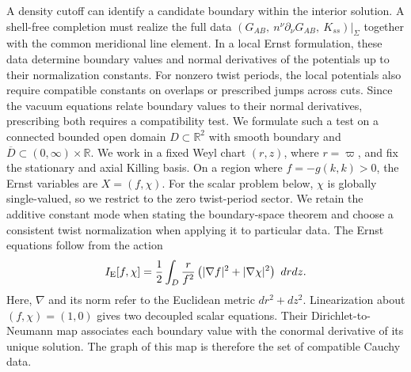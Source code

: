 \documentclass[amsmath,amsfonts,amssymb,aps,pra,superscriptaddress,10pt]{revtex4-2}
\numberwithin{equation}{section}
\theoremstyle{plain}
\theoremstyle{definition}
\theoremstyle{remark}
\theoremstyle{definition}
\begin{document}
A density cutoff can identify a candidate boundary within the interior solution. A shell-free completion must realize the full data
$\left(G_{AB},\ n^\nu\partial_\nu G_{AB},\ K_{ss}\right)\big|_\Sigma$ together with the common meridional line element. In a local Ernst formulation, these data determine boundary values and normal derivatives of the potentials up to their normalization constants. For nonzero twist periods, the local potentials also require compatible constants on overlaps or prescribed jumps across cuts. Since the vacuum equations relate boundary values to their normal derivatives, prescribing both requires a compatibility test. We formulate such a test on a connected bounded open domain $D\subset\mathbb{R}^2$ with smooth boundary and $\overline{D}\subset(0,\infty)\times\mathbb{R}$. We work in a fixed Weyl chart $(r,z)$, where $r=\varpi$, and fix the stationary and axial Killing basis. On a region where $f=-g(k,k)>0$, the Ernst variables are $X=(f,\chi)$. For the scalar problem below, $\chi$ is globally single-valued, so we restrict to the zero twist-period sector. We retain the additive constant mode when stating the boundary-space theorem and choose a consistent twist normalization when applying it to particular data. The Ernst equations follow from the action
\begin{equation}\label{Ernstsigmaact}
I_{\rm{E}}[f,\chi]=\frac{1}{2}\int_D\frac r{f^2}\left(|\nabla f|^2+|\nabla\chi|^2\right)~drdz.
\end{equation}
Here, $\nabla$ and its norm refer to the Euclidean metric $dr^2+dz^2$. Linearization about $(f,\chi)=(1,0)$ gives two decoupled scalar equations. Their Dirichlet-to-Neumann map associates each boundary value with the conormal derivative of its unique solution. The graph of this map is therefore the set of compatible Cauchy data.
\end{document}
